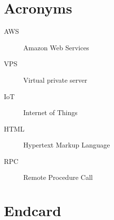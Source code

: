 \documentclass[../main.tex]{subfiles}
\begin{document}
\chapter{Acronyms}

\begin{description}
  \item[AWS] Amazon Web Services
  \item[VPS] Virtual private server
  \item[IoT] Internet of Things
  \item[HTML] Hypertext Markup Language
  \item[RPC] Remote Procedure Call
\end{description}

\chapter{Endcard}
\end{document}
